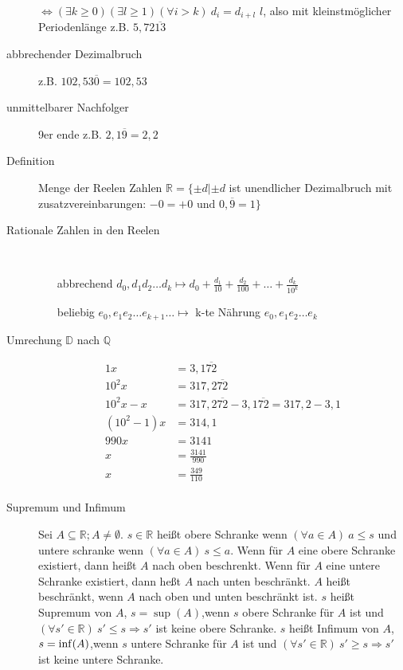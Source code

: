 \begin{description}
    $\Leftrightarrow (\exists k \geq 0)(\exists l \geq 1) (\forall i > k)\ d_i= d_{i + l}$ $l$, also mit kleinstmöglicher Periodenlänge z.B. $5{,}72\overline{13}$
    \item[abbrechender Dezimalbruch] z.B. $102{,}53\overline{0} = 102{,}53$
    \item[unmittelbarer Nachfolger] 9er ende z.B. $2{,}1\overline{9} = 2{,}2$
    \item[Definition] Menge der Reelen Zahlen $\mathbb{R} = \lbrace \pm d | \pm d $ ist unendlicher Dezimalbruch mit zusatzvereinbarungen: $ -0 = +0 \textrm{ und } 0{,}\overline{9} = 1 \rbrace$
    \item[Rationale Zahlen in den Reelen] \
    \begin{itemize}
        \item[abbrechend] $d_0{,}d_1 d_2 \dots d_k \longmapsto d_0 + \frac{d_1}{10}+\frac{d_2}{100} + \dots + \frac{d_k}{10^k}$
        \item[beliebig] $e_0{,}e_1 e_2 \dots e_{k + 1} \dots \longmapsto$ k-te Nährung $e_0{,}e_1 e_2 \dots e_k$
    \end{itemize}
    \item[Umrechung $\mathbb{D}$ nach $\mathbb{Q}$]
    \begin{alignat*}{1}
        x         & = 3{,}1\overline{72}                                          \\
        10^{2}x     & = 317{,}2\overline{72}                                        \\
        10^{2}x-x   & = 317{,}2\overline{72} - 3{,}1\overline{72} = 317{,}2 - 3{,}1 \\
        (10^2-1)x & = 314{,}1                                                     \\
        990x      & = 3141                                                        \\
        x         & = \frac{3141}{990}                                            \\
        x         & = \frac{349}{110}                                             \\
    \end{alignat*}
    \item[Supremum und Infimum] Sei $A \subseteq \mathbb{R}; A \not = \emptyset$. $s \in \mathbb{R}$ heißt obere Schranke wenn $(\forall a \in A)\ a \leq s$ und untere schranke wenn $(\forall a \in A)\ s \leq a$. Wenn für $A$ eine obere Schranke existiert, dann heißt $A$ nach oben beschrenkt. Wenn für $A$ eine untere Schranke existiert, dann heßt $A$ nach unten beschränkt. $A$ heißt beschränkt, wenn $A$ nach oben und unten beschränkt ist. $s$ heißt Supremum von $A$, $s = \sup(A)$,wenn $s$ obere Schranke für $A$ ist und $(\forall s' \in \mathbb{R})\ s' \leq s \Rightarrow s'$ ist keine obere Schranke. $s$ heißt Infimum von $A$, $s = \operatorname{inf}(A)$,wenn $s$ untere Schranke für $A$ ist und $(\forall s' \in \mathbb{R})\ s' \geq s \Rightarrow s'$ ist keine untere Schranke.


\end{description}
